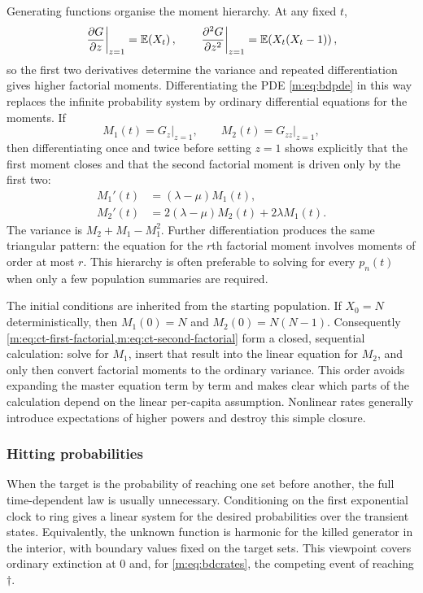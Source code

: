 Generating functions organise the moment hierarchy.  At any fixed $t$,
\begin{equation}
  \left.\frac{\partial G}{\partial z}\right|_{z=1}=\mathbb{E}\!\left(X_t\right),
  \qquad
  \left.\frac{\partial^2G}{\partial z^2}\right|_{z=1}
  =\mathbb{E}\!\left(X_t(X_t-1)\right),
  \label{m:eq:pgf-moments}
\end{equation}
so the first two derivatives determine the variance and repeated differentiation
gives higher factorial moments.  Differentiating the PDE \cref{m:eq:bdpde} in this
way replaces the infinite probability system by ordinary differential equations
for the moments.  If
\[
  M_1(t)=\left.G_z\right|_{z=1},
  \qquad
  M_2(t)=\left.G_{zz}\right|_{z=1},
\]
then differentiating once and twice before setting $z=1$ shows explicitly that
the first moment closes and that the second factorial moment is driven only by
the first two:
\begin{align}
  M_1'(t)&=(\lambda-\mu)M_1(t),
  \label{m:eq:ct-first-factorial}\\
  M_2'(t)&=2(\lambda-\mu)M_2(t)+2\lambda M_1(t).
  \label{m:eq:ct-second-factorial}
\end{align}
The variance is $M_2+M_1-M_1^2$.  Further differentiation produces the same
triangular pattern: the equation for the $r$th factorial moment involves moments
of order at most $r$.  This hierarchy is often preferable to solving for every
$p_n(t)$ when only a few population summaries are required.

The initial conditions are inherited from the starting population.  If $X_0=N$
deterministically, then $M_1(0)=N$ and $M_2(0)=N(N-1)$.  Consequently
\cref{m:eq:ct-first-factorial,m:eq:ct-second-factorial} form a closed, sequential
calculation: solve for $M_1$, insert that result into the linear equation for
$M_2$, and only then convert factorial moments to the ordinary variance.  This
order avoids expanding the master equation term by term and makes clear which
parts of the calculation depend on the linear per-capita assumption.  Nonlinear
rates generally introduce expectations of higher powers and destroy this simple
closure.

\subsubsection{Hitting probabilities}\label{m:sec:hitting-probabilities}

When the target is the probability of reaching one set before another, the full
time-dependent law is usually unnecessary.  Conditioning on the first exponential
clock to ring gives a linear system for the desired probabilities over the
transient states.  Equivalently, the unknown function is harmonic for the killed
generator in the interior, with boundary values fixed on the target sets.  This
viewpoint covers ordinary extinction at $0$ and, for \cref{m:eq:bdcrates}, the
competing event of reaching $\dagger$.

